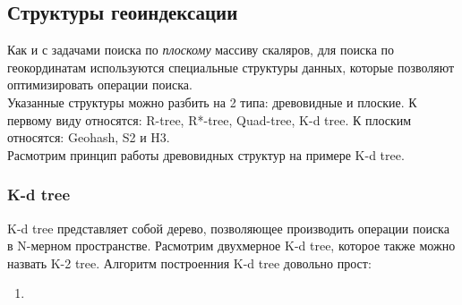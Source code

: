 \documentclass{article}
\begin{document}
    \subsection{Структуры геоиндексации}
    Как и с задачами поиска по \textit{плоскому} массиву скаляров, для поиска по геокординатам используются специальные структуры данных, которые позволяют оптимизировать операции поиска. \\
    Указанные структуры можно разбить на 2 типа: древовидные и плоские. К первому виду относятся: R-tree, R*-tree, Quad-tree, K-d tree. К плоским относятся: Geohash, S2 и H3. \\
    Расмотрим принцип работы древовидных структур на примере K-d tree.\\
    \subsubsection{K-d tree}
    K-d tree представляет собой дерево, позволяющее производить операции поиска в N-мерном пространстве. Расмотрим двухмерное K-d tree, которое также можно назвать K-2 tree.
    Алгоритм построенния K-d tree довольно прост:
    \begin{enumerate}
        \item
    \end{enumerate}
\end{document}
